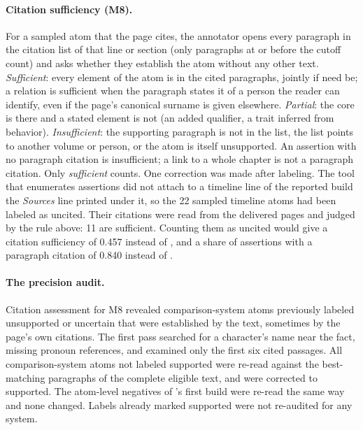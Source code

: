 \paragraph{Citation sufficiency (M8).} For a sampled atom that the page cites, the annotator
opens every paragraph in the citation list of that line or section (only paragraphs at or
before the cutoff count) and asks whether they establish the atom without any other text.
\emph{Sufficient}: every element of the atom is in the cited paragraphs, jointly if need be; a
relation is sufficient when the paragraph states it of a person the reader can identify, even
if the page's canonical surname is given elsewhere. \emph{Partial}: the core is there and a
stated element is not (an added qualifier, a trait inferred from behavior).
\emph{Insufficient}: the supporting paragraph is not in the list, the list points to another
volume or person, or the atom is itself unsupported. An assertion with no paragraph citation is
insufficient; a link to a whole chapter is not a paragraph citation. Only \emph{sufficient}
counts. One correction was made after labeling. The tool that enumerates assertions did not
attach to a timeline line of the reported build the \emph{Sources} line printed under it, so
the 22 sampled timeline atoms had been labeled as uncited. Their citations were read from
the delivered pages and judged by the rule above: 11 are sufficient. Counting them as uncited
would give \sys a citation sufficiency of 0.457 instead of , and a share
of assertions with a paragraph citation of 0.840 instead of .

\paragraph{The precision audit.} Citation assessment for M8 revealed comparison-system
atoms previously labeled unsupported or uncertain that were established by the text,
sometimes by the page's own citations. The first pass searched for a character's name near
the fact, missing pronoun references, and examined only the first six cited passages.
All  comparison-system atoms not labeled supported were re-read
against the best-matching paragraphs of the complete eligible text, and
 were corrected to supported. The atom-level negatives of \sys's
first build were re-read the same way and none changed. Labels already marked supported were not re-audited for
any system.

\ifnwhuman
